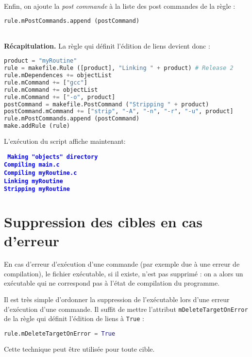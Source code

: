 \documentclass[a4paper,11pt]{extarticle}
\begin{document}
~\\Enfin, on ajoute la \emph{post commande} à la liste des post commandes de la règle :
\begin{lstlisting}[language=py]
rule.mPostCommands.append (postCommand)
\end{lstlisting}


~\\{\bf Récapitulation.} La règle qui définit l'édition de liens devient donc :
\begin{lstlisting}[language=py]
product = "myRoutine"
rule = makefile.Rule ([product], "Linking " + product) # Release 2
rule.mDependences += objectList
rule.mCommand += ["gcc"]
rule.mCommand += objectList
rule.mCommand += ["-o", product]
postCommand = makefile.PostCommand ("Stripping " + product)
postCommand.mCommand += ["strip", "-A", "-n", "-r", "-u", product]
rule.mPostCommands.append (postCommand)
make.addRule (rule)
\end{lstlisting}

L'exécution du script affiche maintenant:

\begin{mdframed}[hidealllines=true,backgroundcolor=lightgray!20]
\tt\footnotesize
\textcolor{blue}{\bf Making "objects" directory}\\
\textcolor{blue}{\bf Compiling main.c}\\
\textcolor{blue}{\bf Compiling myRoutine.c}\\
\textcolor{blue}{\bf Linking myRoutine}\\
\textcolor{blue}{\bf Stripping myRoutine}
\end{mdframed}







\section{Suppression des cibles en cas d'erreur}

En cas d'erreur d'exécution d'une commande (par exemple due à une erreur de compilation), le fichier exécutable, si il existe, n'est pas supprimé : on a alors un exécutable qui ne correspond pas à l'état de compilation du programme.

Il est très simple d'ordonner la suppression de l'exécutable lors d'une erreur d'exécution d'une commande. Il suffit de mettre l'attribut \texttt{mDeleteTargetOnError} de la règle qui définit l'édition de liens à \texttt{True} :
\begin{lstlisting}[language=py]
rule.mDeleteTargetOnError = True
\end{lstlisting}
Cette technique peut être utilisée pour toute cible.
\end{document}
